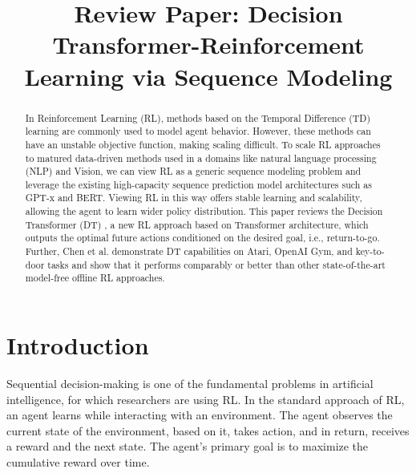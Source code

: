 \documentclass[conference]{IEEEtran}
\begin{document}
\title{Review Paper: Decision Transformer-Reinforcement Learning via Sequence 
Modeling}

\author{
}

\maketitle

\begin{abstract}
In Reinforcement Learning (RL), methods based on the Temporal Difference (TD) learning are commonly used to model agent behavior.  However, these methods can have an unstable objective function, making scaling difficult. To scale RL approaches to matured data-driven methods used in a domains like natural language processing (NLP) and Vision, we can view RL as a generic sequence modeling problem and leverage the existing high-capacity sequence prediction model architectures such as GPT-x and BERT. Viewing RL in this way offers stable learning and scalability, allowing the agent to learn wider policy distribution. This paper reviews the Decision Transformer (DT) \cite{b1}, a new RL approach based on Transformer architecture, which outputs the optimal future actions conditioned on the desired goal, i.e., return-to-go. Further, Chen et al.\cite{b1} demonstrate DT capabilities on Atari, OpenAI Gym, and key-to-door tasks and show that it performs comparably or better than other state-of-the-art model-free offline RL approaches.
\end{abstract}


\section{Introduction}
Sequential decision-making is one of the fundamental problems in artificial intelligence, for which researchers are using RL.
In the standard approach of RL, an agent learns while interacting with an environment. The agent observes the current state of the environment, based on it, takes action, and in return, receives a reward and the next state. The agent's primary goal is to maximize the cumulative reward over time.
\end{document}
